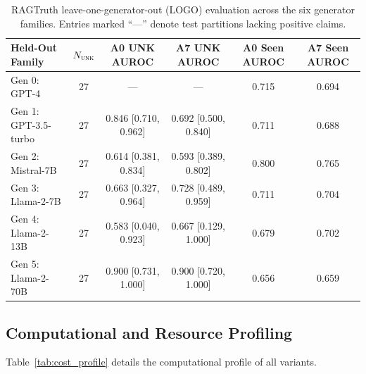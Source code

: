 \documentclass[pdflatex,sn-mathphys,Numbered]{sn-jnl}
\begin{document}
\begin{table}[htbp]
\caption{RAGTruth leave-one-generator-out (LOGO) evaluation across the six generator families. Entries marked ``---'' denote test partitions lacking positive claims.}\label{tab:rag_logo}
\scriptsize
\setlength{\tabcolsep}{2.2pt}
\begin{tabular}{@{}lccccc@{}}
\toprule
\textbf{Held-Out Family} & $N_{\textsc{unk}}$ & \textbf{A0 UNK AUROC} & \textbf{A7 UNK AUROC} & \textbf{A0 Seen AUROC} & \textbf{A7 Seen AUROC} \\
\midrule
Gen 0: GPT-4 & 27 & \multicolumn{1}{c}{---} & \multicolumn{1}{c}{---} & 0.715 & 0.694 \\
Gen 1: GPT-3.5-turbo & 27 & 0.846 [0.710, 0.962] & 0.692 [0.500, 0.840] & 0.711 & 0.688 \\
Gen 2: Mistral-7B & 27 & 0.614 [0.381, 0.834] & 0.593 [0.389, 0.802] & 0.800 & 0.765 \\
Gen 3: Llama-2-7B & 27 & 0.663 [0.327, 0.964] & 0.728 [0.489, 0.959] & 0.711 & 0.704 \\
Gen 4: Llama-2-13B & 27 & 0.583 [0.040, 0.923] & 0.667 [0.129, 1.000] & 0.679 & 0.702 \\
Gen 5: Llama-2-70B & 27 & 0.900 [0.731, 1.000] & 0.900 [0.720, 1.000] & 0.656 & 0.659 \\
\bottomrule
\end{tabular}
\end{table}

\subsection{Computational and Resource Profiling}\label{subsec:results_cost}

Table~\ref{tab:cost_profile} details the computational profile of all variants.
\end{document}
